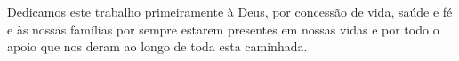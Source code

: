 Dedicamos este trabalho primeiramente à Deus, por concessão de vida, saúde e fé e às nossas famílias por sempre estarem presentes em nossas vidas e por todo o apoio que nos deram ao longo de toda esta caminhada.